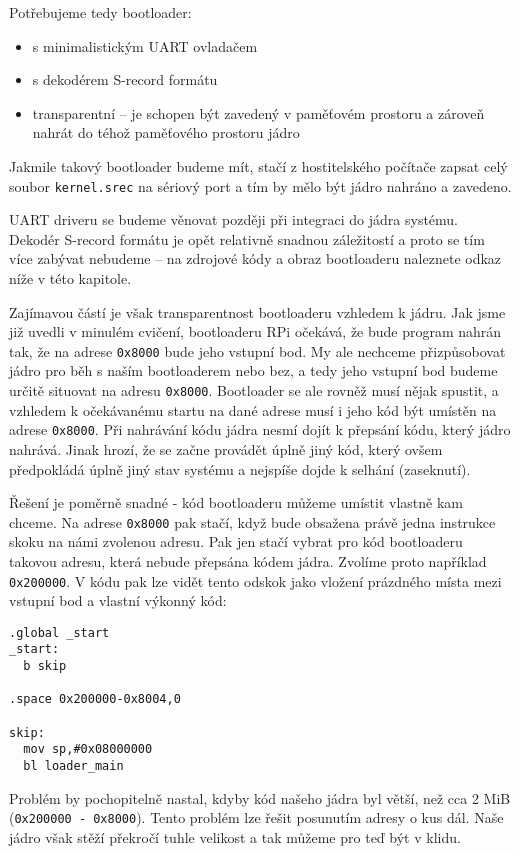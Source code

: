 \documentclass{article}
\begin{document}
Potřebujeme tedy bootloader:
\begin{itemize}
	\item s minimalistickým UART ovladačem
	\item s dekodérem S-record formátu
	\item transparentní -- je schopen být zavedený v paměťovém prostoru a zároveň nahrát do téhož paměťového prostoru jádro
\end{itemize}

Jakmile takový bootloader budeme mít, stačí z hostitelského počítače zapsat celý soubor \texttt{kernel.srec} na sériový port a tím by mělo být jádro nahráno a zavedeno.

UART driveru se budeme věnovat později při integraci do jádra systému. Dekodér S-record formátu je opět relativně snadnou záležitostí a proto se tím více zabývat nebudeme -- na zdrojové kódy a obraz bootloaderu naleznete odkaz níže v této kapitole.

Zajímavou částí je však transparentnost bootloaderu vzhledem k jádru. Jak jsme již uvedli v minulém cvičení,  bootloaderu RPi očekává, že bude program nahrán tak, že na adrese \texttt{0x8000} bude jeho vstupní bod. My ale nechceme přizpůsobovat jádro pro běh s naším bootloaderem nebo bez, a tedy jeho vstupní bod budeme určitě situovat na adresu \texttt{0x8000}. Bootloader se ale rovněž musí nějak spustit, a vzhledem k očekávanému startu na dané adrese musí i jeho kód být umístěn na adrese \texttt{0x8000}. Při nahrávání kódu jádra nesmí dojít k přepsání kódu, který jádro nahrává. Jinak hrozí, že se začne  provádět úplně jiný kód, který ovšem předpokládá úplně jiný stav systému a nejspíše dojde k selhání (zaseknutí).

Řešení je poměrně snadné - kód bootloaderu můžeme umístit vlastně kam chceme. Na adrese \texttt{0x8000} pak stačí, když bude obsažena právě jedna instrukce skoku na námi zvolenou adresu. Pak jen stačí vybrat pro kód bootloaderu takovou adresu, která nebude přepsána kódem jádra. Zvolíme proto například \texttt{0x200000}. V kódu pak lze vidět tento odskok jako vložení prázdného místa mezi vstupní bod a vlastní výkonný kód:

\begin{lstlisting}
.global _start
_start:
  b skip

.space 0x200000-0x8004,0

skip:
  mov sp,#0x08000000
  bl loader_main
\end{lstlisting}

Problém by pochopitelně nastal, kdyby kód našeho jádra byl větší, než cca 2 MiB (\texttt{0x200000 - 0x8000}). Tento problém lze řešit posunutím adresy o kus dál. Naše jádro však stěží překročí tuhle velikost a tak můžeme pro teď být v klidu.
\end{document}
